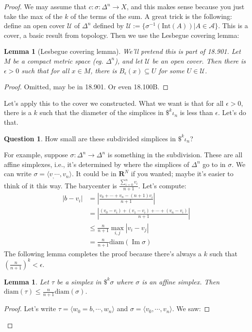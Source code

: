 \documentclass{amsart}
\theoremstyle{theorem}
\newtheorem{lemma}[theorem]{Lemma}
\theoremstyle{definition}
\newtheorem{question}[theorem]{Question}
\DeclareMathOperator{\img}{Im}
\newcommand{\sca}{\mathscr{A}}
\begin{document}
\begin{proof}
We may assume that $c:\sigma:\Delta^n\to X$, and this makes sense because you just take the max of the $k$ of the terms of the sum. A great trick is the following: define an open cover $\mathscr{U}$ of $\Delta^n$ defined by $\mathscr{U}:=\{\sigma^{-1}(\mathrm{Int}(A))|A\in\sca\}$. This is a cover, a basic result from topology. Then we use the Lesbegue covering lemma:
\begin{lemma}[Lesbegue covering lemma]
We'll pretend this is part of 18.901. Let $M$ be a compact metric space (eg. $\Delta^n$), and let $\mathscr{U}$ be an open cover. Then there is $\epsilon> 0$ such that for all $x\in M$, there is $B_\epsilon(x)\subseteq U$ for some $U\in \mathscr{U}$.
\end{lemma}
\begin{proof}
Omitted, may be in 18.901. Or even 18.100B.
\end{proof}
Let's apply this to the cover we constructed. What we want is that for all $\epsilon>0$, there is a $k$ such that the diameter of the simplices in $\$^k\iota_n$ is less than $\epsilon$. Let's do that.
\begin{question}
How small are these subdivided simplices in $\$^k\iota_n$?
\end{question}
For example, suppose $\sigma:\Delta^n\to\Delta^n$ is something in the subdivision. These are all affine simplexes, i.e., it's determined by where the simplices of $\Delta^n$ go to in $\sigma$. We can write $\sigma=\langle v_,\cdots,v_n\rangle$. It could be in $\mathbf{R}^N$ if you wanted; maybe it's easier to think of it this way. The barycenter is $\frac{\sum_{i=0}^nv_i}{n+1}$. Let's compute:
\begin{align*}
|b-v_i| & =\left|\frac{v_0+\cdots+v_n-(n+1)v_i}{n+1}\right|\\
& =\left|\frac{(v_0-v_i)+(v_1-v_i)+\cdots+(v_n-v_i)}{n+1}\right|\\
 & \leq \frac{n}{n+1}\max_{i,j}|v_i-v_j|\\
 & = \frac{n}{n+1}\mathrm{diam}(\img\sigma)
\end{align*}
The following lemma completes the proof because there's always a $k$ such that $\left(\frac{n}{n+1}\right)^k<\epsilon$.
\begin{lemma}
Let $\tau$ be a simplex in $\$^k\sigma$ where $\sigma$ is an affine simplex. Then $\mathrm{diam}(\tau)\leq \frac{n}{n+1}\mathrm{diam}(\sigma)$.
\end{lemma}
\begin{proof}
Let's write $\tau=\langle w_0=b,\cdots,w_n\rangle$ and $\sigma=\langle v_0,\cdots,v_n\rangle$. We saw:

\end{proof}
\end{proof}
\end{document}
